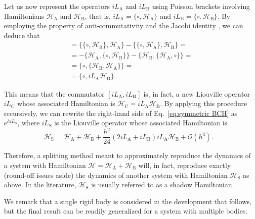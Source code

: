 \documentclass[
journal=jctcce,
layout=twocolumn
]{achemso}
\newcommand{\Ham}[1]{{\mathcal H}_\text{#1}}    %
\newcommand{\Liu}[1]{i\!L_\text{#1}}            %
\newcommand{\timestep}{h}
\begin{document}
Let us now represent the operators $\Liu A$ and $\Liu B$ using Poisson brackets involving Hamiltonians $\Ham A$ and $\Ham B$, that is, $\Liu A = \{\circ,\Ham A\}$ and $\Liu B = \{\circ,\Ham B\}$.
By employing the property of anti-commutativity and the Jacobi identity \cite{Hairer_2006}, we can deduce that
\begin{align*}
[\Liu A,\Liu B] &= \{\{\circ,\Ham B\},\Ham A\} - \{\{\circ,\Ham A\},\Ham B\} = \\
&= -\{\Ham A,\{\circ,\Ham B\}\} - \{\Ham B,\{\Ham A,\circ\}\} = \\
&= \{\circ,\{\Ham B,\Ham A\}\} = \\
&= \{\circ,{\Liu A} {\Ham B}\}.
\end{align*}

This means that the commutator $[\Liu A,\Liu B]$ is, in fact, a new Liouville operator $\Liu C$ whose associated Hamiltonian is $\Ham C = {\Liu A}{\Ham B}$.
By applying this procedure recursively, we can rewrite the right-hand side of Eq.~\eqref{eq:symmetric BCH} as $e^{\timestep \Liu S}$, where $\Liu S$ is the Liouville operator whose associated Hamiltonian is
\begin{equation*}
\label{eq:general shadow hamiltonian}
\Ham{S} = \Ham A + \Ham B + \frac{\timestep^2}{24} (2 \Liu A + \Liu B){\Liu A}{\Ham B} + \mathcal{O}(\timestep^4).
\end{equation*}

Therefore, a splitting method meant to approximately reproduce the dynamics of a system with Hamiltonian $\Ham{} = \Ham A + \Ham B$ will, in fact, reproduce exactly (round-off issues aside) the dynamics of another system with Hamiltonian $\Ham{S}$ as above.
In the literature, $\Ham{S}$ is usually referred to as a shadow Hamiltonian.

We remark that a single rigid body is considered in the development that follows, but the final result can be readily generalized for a system with multiple bodies.
\end{document}
